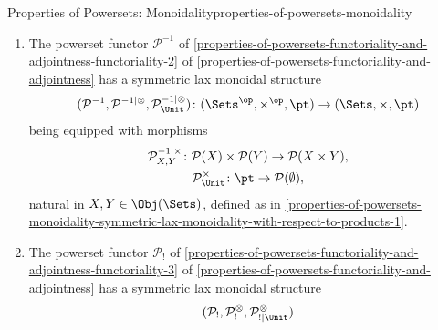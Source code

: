 \begin{proposition}{Properties of Powersets: Monoidality}{properties-of-powersets-monoidality}
\begin{enumerate}
            \begin{itemize}
                \item The map $\mathcal{P}^{\times}_{*|X,Y}$ is given by
                    \[
                        \mathcal{P}^{\times}_{*|X,Y}(U,V)%
                        \defeq%
                        U\times V
                    \]%
                    for each $(U,V)\in\mathcal{P}(X)\times\mathcal{P}(Y)$,
                \item The map $\mathcal{P}^{\times}_{*|\Unit}$ is given by
                    \[
                        \mathcal{P}^{\times}_{*|\Unit}(\star)%
                        =%
                        \pt.%
                    \]%
            \end{itemize}
        \item\label{properties-of-powersets-monoidality-symmetric-lax-monoidality-with-respect-to-products-2}The powerset functor $\mathcal{P}^{-1}$ of \cref{properties-of-powersets-functoriality-and-adjointness-functoriality-2} of \cref{properties-of-powersets-functoriality-and-adjointness} has a symmetric lax monoidal structure
            \[
                (\mathcal{P}^{-1},\mathcal{P}^{-1|\otimes},\mathcal{P}^{-1|\otimes}_{\Unit})
                \colon
                (\Sets^{\op},\times^{\op},\pt)
                \to
                (\Sets,\times,\pt)
            \]%
            being equipped with morphisms%
            \[
                \begin{gathered}
                    \mathcal{P}^{-1|\times}_{X,Y} \colon \mathcal{P}(X)\times\mathcal{P}(Y) \to \mathcal{P}(X\times Y),\\
                    \mathcal{P}^{\times}_{\Unit}  \colon \pt                                \to \mathcal{P}(\emptyset),
                \end{gathered}
            \]%
            natural in $X,Y\in\Obj(\Sets)$, defined as in \cref{properties-of-powersets-monoidality-symmetric-lax-monoidality-with-respect-to-products-1}.
        \item\label{properties-of-powersets-monoidality-symmetric-lax-monoidality-with-respect-to-products-3}The powerset functor $\mathcal{P}_{!}$ of \cref{properties-of-powersets-functoriality-and-adjointness-functoriality-3} of \cref{properties-of-powersets-functoriality-and-adjointness} has a symmetric lax monoidal structure
            \[
                (\mathcal{P}_{!},\mathcal{P}^{\otimes}_{!},\mathcal{P}^{\otimes}_{!|\Unit})
\]
\end{enumerate}
\end{proposition}
